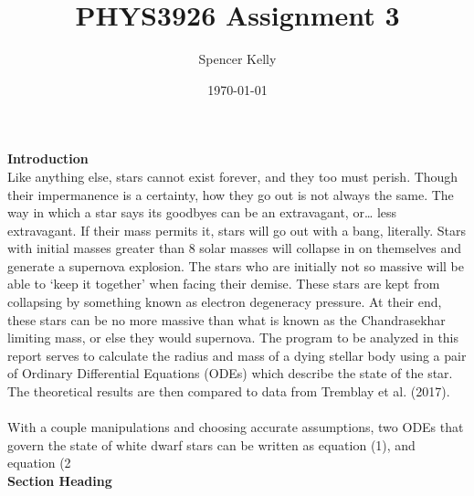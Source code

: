 \documentclass[11pt]{article}
\title{\large{PHYS3926 Assignment 3}}
\author{Spencer Kelly}
\date{\today}
\begin{document}
\maketitle
\textbf{Introduction}\\
    \tab Like anything else, stars cannot exist forever, and they too must perish. Though their impermanence is a certainty, how they go out is not always the same. The way in which a star says its goodbyes can be an extravagant, or… less extravagant. If their mass permits it, stars will go out with a bang, literally. Stars with initial masses greater than 8 solar masses will collapse in on themselves and generate a supernova explosion. The stars who are initially not so massive will be able to ‘keep it together’ when facing their demise. These stars are kept from collapsing by something known as electron degeneracy pressure. At their end, these stars can be no more massive than what is known as the Chandrasekhar limiting mass, or else they would supernova. The program to be analyzed in this report serves to calculate the radius and mass of a dying stellar body using a pair of Ordinary Differential Equations (ODEs) which describe the state of the star. The theoretical results are then compared to data from Tremblay et al. (2017).
    \\\\
	\tab With a couple manipulations and choosing accurate assumptions, two ODEs that govern the state of white dwarf stars can be written as equation (1), and equation (2
\\
\textbf{Section Heading}\\
\end{document}

